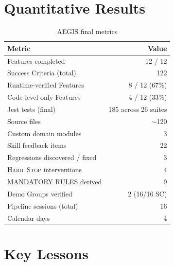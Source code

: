 \documentclass[11pt,a4paper,openright,twoside]{report}
\newcommand{\hardstop}{\textsc{Hard~Stop}}
\begin{document}
\section{Quantitative Results}

\begin{table}[H]
\centering
\caption{AEGIS final metrics}
\label{tab:aegis-metrics}
\begin{tabularx}{\textwidth}{Xr}
\toprule
\textbf{Metric} & \textbf{Value} \\
\midrule
Features completed & 12 / 12 \\
Success Criteria (total) & 122 \\
Runtime-verified Features & 8 / 12 (67\%) \\
Code-level-only Features & 4 / 12 (33\%) \\
Jest tests (final) & 185 across 26 suites \\
Source files & $\sim$120 \\
Custom domain modules & 3 \\
Skill feedback items & 22 \\
Regressions discovered / fixed & 3 \\
\hardstop{} interventions & 4 \\
MANDATORY RULES derived & 9 \\
Demo Groups verified & 2 (16/16 SC) \\
Pipeline sessions (total) & 16 \\
Calendar days & 4 \\
\bottomrule
\end{tabularx}
\end{table}

\section{Key Lessons}
\end{document}
